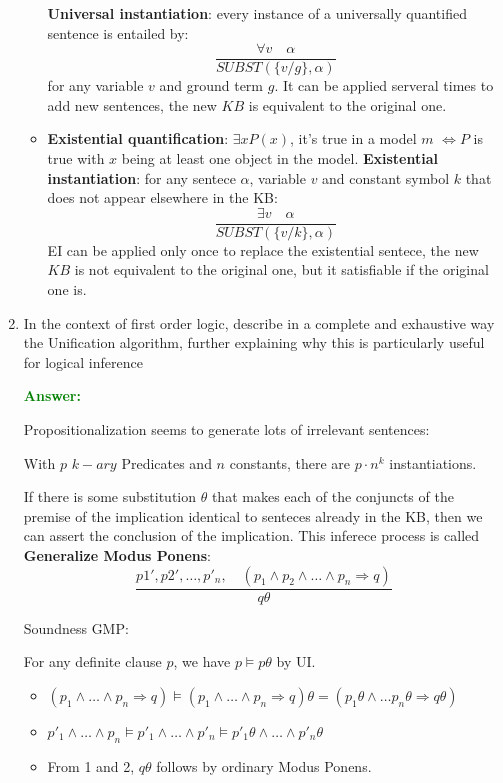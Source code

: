 \documentclass[12pt]{article}
\begin{document}
\begin{enumerate}[label=\textbf{FOL.\arabic*}]
\begin{itemize}
        \textbf{Universal instantiation}: every instance of a universally quantified sentence is entailed by: 
        \begin{equation}
            \frac{\forall v \quad \alpha}{SUBST(\{v/g\},\alpha)}
        \end{equation}
        for any variable $v$ and ground term $g$. It can be applied serveral times to add new sentences, the new $KB$ is equivalent to the original one.
        \item\textbf{Existential quantification}: $\exists x P(x)$, it's true in a model $m$ $\iff P$ is true with $x$ being 
        at least one object in the model.
        \textbf{Existential instantiation}: for any sentece $\alpha$, variable $v$ and constant symbol $k$ that does not appear elsewhere in the KB:
        \begin{equation}
            \frac{\exists v \quad \alpha}{SUBST(\{v/k\},\alpha)}
        \end{equation}
        EI can be applied only once to replace the existential sentece, the new $KB$ is not equivalent to the original one, but it satisfiable
        if the original one is.
    \end{itemize}

    \item In the context of first order logic, describe in a complete and exhaustive way the Unification algorithm, further explaining why this is particularly useful for logical inference
    
    \textcolor{green}{\textbf{Answer:}}

    Propositionalization seems to generate lots of irrelevant sentences:
    \begin{center}
        With $p$ $k-ary$ Predicates and $n$ constants, there are $p\cdot n^k$ instantiations.
    \end{center}

    If there is some substitution $\theta$ that makes each of the conjuncts of the premise of the implication identical 
    to senteces already in the KB, then we can assert the conclusion of the implication.
    This inferece process is called \textbf{Generalize Modus Ponens}:
    \begin{equation}
        \frac{p1',p2',\ldots,p'_n,\quad (p_1\land p_2\land\ldots\land p_n \Rightarrow q)}
        {q\theta}
    \end{equation}

    Soundness GMP:

    For any definite clause $p$, we have $p\vDash p\theta$ by UI.
    \begin{itemize}
        \item $(p_1\land\ldots\land p_n \Rightarrow q)\vDash(p_1\land\ldots\land p_n \Rightarrow q)\theta=(p_1\theta\land\ldots p_n\theta\Rightarrow q\theta)$
        \item $p'_1\land\ldots\land p_n \vDash p'_1\land\ldots\land p'_n\vDash p'_1\theta\land\ldots\land p'_n\theta$
        \item From 1 and 2, $q\theta$ follows by ordinary Modus Ponens.
    \end{itemize}


\end{enumerate}
\end{document}
